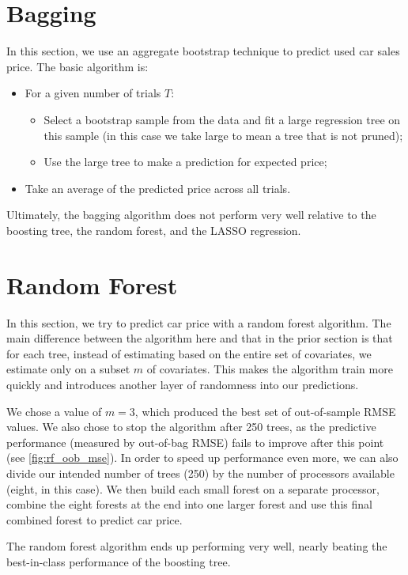 \documentclass[11pt, fleqn]{article}
\begin{document}
\section{Bagging}

In this section, we use an aggregate bootstrap technique to predict used car sales price. The basic algorithm is:
\begin{itemize}
\item For a given number of trials $T$:
\begin{itemize}
\item Select a bootstrap sample from the data and fit a large regression tree on this sample (in this case we take large to mean a tree that is not pruned);
\item Use the large tree to make a prediction for expected price;
\end{itemize}
\item Take an average of the predicted price across all trials.
\end{itemize}

Ultimately, the bagging algorithm does not perform very well relative to the boosting tree, the random forest, and the LASSO regression. 

\section{Random Forest}

In this section, we try to predict car price with a random forest algorithm. The main difference between the algorithm here and that in the prior section is that for each tree, instead of estimating based on the entire set of covariates, we estimate only on a subset $m$ of covariates. This makes the algorithm train more quickly and introduces another layer of randomness into our predictions. 

We chose a value of $m=3$, which produced the best set of out-of-sample RMSE values. We also chose to stop the algorithm after 250 trees, as the predictive performance (measured by out-of-bag RMSE) fails to improve after this point (see \cref{fig:rf_oob_mse}). In order to speed up performance even more, we can also divide our intended number of trees (250) by the number of processors available (eight, in this case). We then build each small forest on a separate processor, combine the eight forests at the end into one larger forest and use this final combined forest to predict car price.

The random forest algorithm ends up performing very well, nearly beating the best-in-class performance of the boosting tree.
\end{document}
